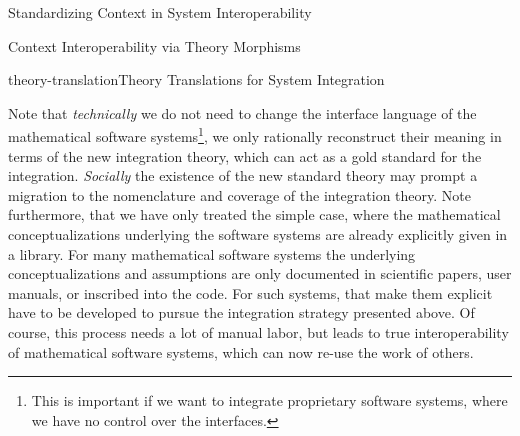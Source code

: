 \begin{omgroup}[id=logics,creators=miko]{Standardizing Context in System Interoperability}
\begin{omgroup}[id=logics.integrating-libraries]{Context Interoperability via Theory  Morphisms}
\begin{myfig}{theory-translation}{Theory Translations for System Integration}\small
\end{myfig}

Note that {\emph{technically}} we do not need to change the interface language of the
mathematical software systems\footnote{This is important if we want to integrate
  proprietary software systems, where we have no control over the interfaces.}, we only
rationally reconstruct their meaning in terms of the new integration theory, which can act
as a gold standard for the integration. {\emph{Socially}} the existence of the new
standard theory may prompt a migration to the nomenclature and coverage of the integration
theory. Note furthermore, that we have only treated the simple case, where the
mathematical conceptualizations underlying the software systems are already explicitly
given in a library. For many mathematical software systems the underlying
conceptualizations and assumptions are only documented in scientific papers, user manuals,
or inscribed into the code. For such systems, {} that make them explicit have to be developed to
pursue the integration strategy presented above. Of course, this process needs a lot of
manual labor, but leads to true interoperability of mathematical software systems, which
can now re-use the work of others.


\end{omgroup}
\end{omgroup}
